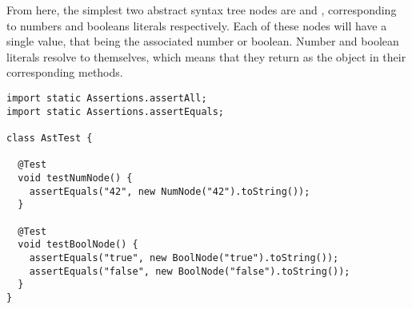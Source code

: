 From here, the simplest two abstract syntax tree nodes are  and , corresponding to numbers and booleans literals respectively. Each of these nodes will have a single value, that being the associated number or boolean. Number and boolean literals resolve to themselves, which means that they return  as the object in their corresponding  methods.





  



\begin{lstlisting}[language=MyJava]
import static Assertions.assertAll;
import static Assertions.assertEquals;

class AstTest {

  @Test
  void testNumNode() {
    assertEquals("42", new NumNode("42").toString());
  }

  @Test
  void testBoolNode() {
    assertEquals("true", new BoolNode("true").toString());
    assertEquals("false", new BoolNode("false").toString());
  }  
}
\end{lstlisting}


